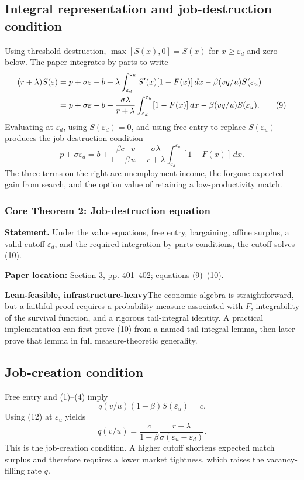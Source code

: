 \documentclass[11pt]{article}
\newcommand{\leaninfra}{\textcolor{darkamber}{\textbf{Lean-feasible, infrastructure-heavy}}}
\newcommand{\papersec}[1]{\textbf{Paper location:} #1}
\newcommand{\statusbox}[2]{\colorbox{#1}{\parbox{0.94\linewidth}{#2}}}
\newcommand{\epsd}{\varepsilon_d}
\newcommand{\epsu}{\varepsilon_u}
\begin{document}
\subsection{Integral representation and job-destruction condition}
Using threshold destruction, $\max[S(x),0]=S(x)$ for $x\ge \epsd$ and zero below. The paper integrates by parts to write
\begin{align}
(r+\lambda)S(\varepsilon)
&=p+\sigma\varepsilon-b
+\lambda\int_{\epsd}^{\epsu}S'(x)[1-F(x)]\,dx
-\beta(vq/u)S(\epsu) \notag\\
&=p+\sigma\varepsilon-b
+\frac{\sigma\lambda}{r+\lambda}
\int_{\epsd}^{\epsu}[1-F(x)]\,dx
-\beta(vq/u)S(\epsu). \tag{9}
\end{align}
Evaluating at $\epsd$, using $S(\epsd)=0$, and using free entry to replace $S(\epsu)$ produces the job-destruction condition
\begin{equation}
p+\sigma\epsd
=b+\frac{\beta c}{1-\beta}\frac vu
-\frac{\sigma\lambda}{r+\lambda}
\int_{\epsd}^{\epsu}[1-F(x)]\,dx. \tag{10}
\end{equation}
The three terms on the right are unemployment income, the forgone expected gain from search, and the option value of retaining a low-productivity match.

\subsubsection*{Core Theorem 2: Job-destruction equation}
\textbf{Statement.} Under the value equations, free entry, bargaining, affine surplus, a valid cutoff $\epsd$, and the required integration-by-parts conditions, the cutoff solves (10).

\papersec{Section 3, pp. 401--402; equations (9)--(10).}

\statusbox{softamber}{\leaninfra\quad The economic algebra is straightforward, but a faithful proof requires a probability measure associated with $F$, integrability of the survival function, and a rigorous tail-integral identity. A practical implementation can first prove (10) from a named tail-integral lemma, then later prove that lemma in full measure-theoretic generality.}

\subsection{Job-creation condition}
Free entry and (1)--(4) imply
\[
q(v/u)(1-\beta)S(\epsu)=c.
\]
Using (12) at $\epsu$ yields
\begin{equation}
q(v/u)=\frac{c}{1-\beta}\frac{r+\lambda}{\sigma(\epsu-\epsd)}. \tag{13}
\end{equation}
This is the job-creation condition. A higher cutoff shortens expected match surplus and therefore requires a lower market tightness, which raises the vacancy-filling rate $q$.
\end{document}
